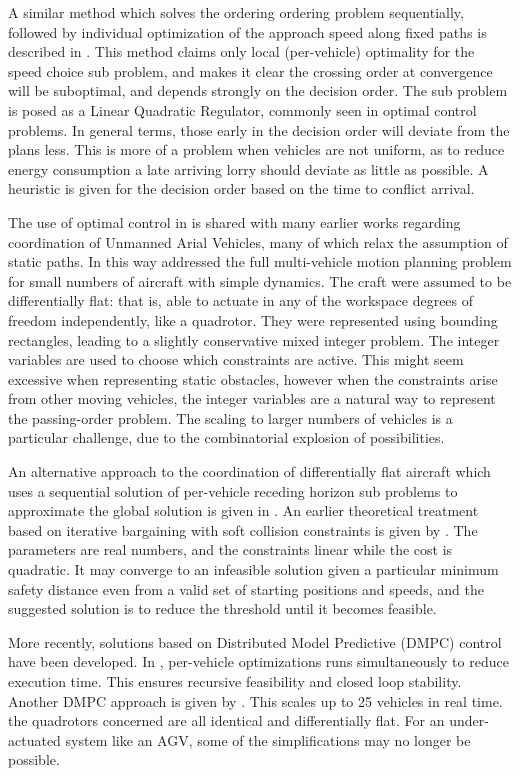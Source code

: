 \documentclass[11pt]{article} %
\begin{document}
A similar method which solves the ordering ordering problem sequentially, followed by individual optimization of the approach speed along fixed paths is described in \cite{DeCampos2017}. This method claims only local (per-vehicle) optimality for the speed choice sub problem, and makes it clear the crossing order at convergence will be suboptimal, and depends strongly on the decision order. The sub problem is posed as a Linear Quadratic Regulator, commonly seen in optimal control problems. In general terms, those early in the decision order will deviate from the plans less. This is more of a problem when vehicles are not uniform, as to reduce energy consumption a late arriving lorry should deviate as little as possible. A heuristic is given for the decision order based on the time to conflict arrival.

The use of optimal control in \cite{DeCampos2017} is shared with many earlier works regarding coordination of Unmanned Arial Vehicles, many of which relax the assumption of static paths. In this way \cite{Schouwenaars2004} addressed the full multi-vehicle motion planning problem for small numbers of aircraft with simple dynamics. The craft were assumed to be differentially flat: that is, able to actuate in any of the workspace degrees of freedom independently, like a quadrotor. They were represented using bounding rectangles, leading to a slightly conservative mixed integer problem. The integer variables are used to choose which constraints are active. This might seem excessive when representing static obstacles, however when the constraints arise from other moving vehicles, the integer variables are a natural way to represent the passing-order problem. The scaling to larger numbers of vehicles is a particular challenge, due to the combinatorial explosion of possibilities.

An alternative approach to the coordination of differentially flat aircraft which uses a sequential solution of per-vehicle receding horizon sub problems to approximate the global solution is given in \cite{Keviczky2008}. An earlier theoretical treatment based on iterative bargaining with soft collision constraints is given by \cite{Inalhan2002}. The parameters are real numbers, and the constraints linear while the cost is quadratic. It may converge to an infeasible solution given a particular minimum safety distance even from a valid set of starting positions and speeds, and the suggested solution is to reduce the threshold until it becomes feasible.  

More recently, solutions based on Distributed Model Predictive (DMPC) control have been developed. In \cite{Dai2017}, per-vehicle optimizations runs simultaneously to reduce execution time. This ensures recursive feasibility and closed loop stability. Another DMPC approach is given by \cite{Luis2018}. This scales up to 25 vehicles in real time. the quadrotors concerned are all identical and differentially flat. For an under-actuated system like an AGV, some of the simplifications may no longer be possible. 
\end{document}
